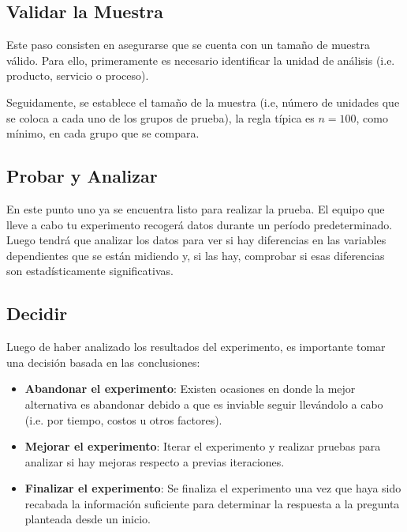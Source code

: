 \subsection{Validar la Muestra}

Este paso consisten en asegurarse que se cuenta con un tamaño de muestra
válido. Para ello, primeramente es necesario identificar la unidad de análisis
(i.e. producto, servicio o proceso).

Seguidamente, se establece el tamaño de la muestra (i.e, número de unidades que
se coloca a cada uno de los grupos de prueba), la regla típica es $n = 100$,
como mínimo, en cada grupo que se compara.

\subsection{Probar y Analizar}

En este punto uno ya se encuentra listo para realizar la prueba. El equipo que
lleve a cabo tu experimento recogerá datos durante un período predeterminado.
Luego tendrá que analizar los datos para ver si hay diferencias en las
variables dependientes que se están midiendo y, si las hay, comprobar si esas
diferencias son estadísticamente significativas.

\subsection{Decidir}

Luego de haber analizado los resultados del experimento, es importante tomar
una decisión basada en las conclusiones:

\begin{itemize}
	\item \textbf{Abandonar el experimento}: Existen ocasiones en donde la mejor
	      alternativa es abandonar debido a que es inviable seguir llevándolo a cabo
	      (i.e. por tiempo, costos u otros factores).

	\item \textbf{Mejorar el experimento}: Iterar el experimento y realizar
	      pruebas para analizar si hay mejoras respecto a previas iteraciones.

	\item \textbf{Finalizar el experimento}: Se finaliza el experimento una vez
	      que haya sido recabada la información suficiente para determinar la respuesta
	      a la pregunta planteada desde un inicio.
\end{itemize}

